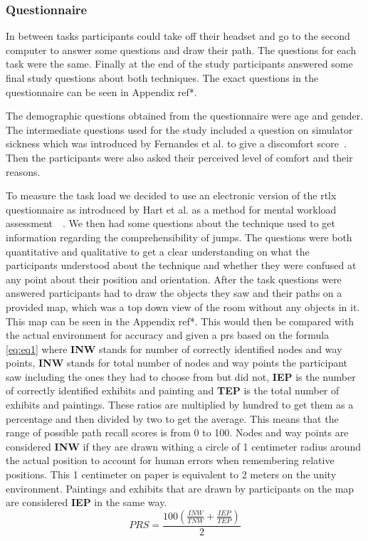 \subsubsection{Questionnaire}
\label{subsubsection DPUS SP SP: User Feedback}
In between tasks participants could take off their headset and go to the second computer to answer some questions and draw their path. The questions for each task were the same. Finally at the end of the study participants answered some final study questions about both techniques. The exact questions in the questionnaire can be seen in Appendix ref*.

The demographic questions obtained from the questionnaire were age and gender. The intermediate questions used for the study included a question on simulator sickness which was introduced by Fernandes et al. to give a discomfort score~\cite{Fernandes2016}. Then the participants were also asked their perceived level of comfort and their reasons.

To measure the task load we decided to use an electronic version of the \acrfull{rtlx} questionnaire as introduced by Hart et al. as a method for mental workload assessment~\cite{Hart1988}~\cite{Hart2006}. We then had some questions about the technique used to get information regarding the comprehensibility of jumps. The questions were both quantitative and qualitative to get a clear understanding on what the participants understood about the technique and whether they were confused at any point about their position and orientation. After the task questions were answered participants had to draw the objects they saw and their paths on a provided map, which was a top down view of the room without any objects in it. This map can be seen in the Appendix ref*. This would then be compared with the actual environment for accuracy and given a \acrfull{prs} based on the formula \ref{eq:eq1} where \textbf{INW} stands for number of correctly identified nodes and way points, \textbf{INW} stands for total number of nodes and way points the participant saw including the ones they had to choose from but did not, \textbf{IEP} is the number of correctly identified exhibits and painting and \textbf{TEP} is the total number of exhibits and paintings. These ratios are multiplied by hundred to get them as a percentage and then divided by two to get the average. This means that the range of possible path recall scores is from 0 to 100. Nodes and way points are considered \textbf{INW} if they are drawn withing a circle of 1 centimeter radius around the actual position to account for human errors when remembering relative positions. This 1 centimeter on paper is equivalent to 2 meters on the unity environment. Paintings and exhibits that are drawn by participants on the map are considered \textbf{IEP} in the same way. 
\begin{equation}
	\label{eq:eq1}
	PRS = \frac{100\left(\frac{INW}{TNW} + \frac{IEP}{TEP}\right)}{2}
\end{equation}

